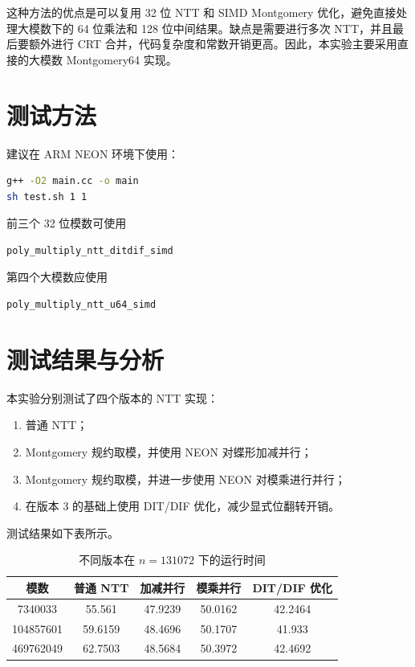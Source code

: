 \documentclass[a4paper]{article}
\begin{document}
这种方法的优点是可以复用 32 位 NTT 和 SIMD Montgomery 优化，避免直接处理大模数下的 64 位乘法和 128 位中间结果。缺点是需要进行多次 NTT，并且最后要额外进行 CRT 合并，代码复杂度和常数开销更高。因此，本实验主要采用直接的大模数 Montgomery64 实现。


\section{测试方法}

建议在 ARM NEON 环境下使用：
\begin{lstlisting}[language=bash]
g++ -O2 main.cc -o main
sh test.sh 1 1
\end{lstlisting}

前三个 32 位模数可使用
\begin{lstlisting}
poly_multiply_ntt_ditdif_simd
\end{lstlisting}
第四个大模数应使用
\begin{lstlisting}
poly_multiply_ntt_u64_simd
\end{lstlisting}

\section{测试结果与分析}

本实验分别测试了四个版本的 NTT 实现：

\begin{enumerate}
    \item 普通 NTT；
    \item Montgomery 规约取模，并使用 NEON 对蝶形加减并行；
    \item Montgomery 规约取模，并进一步使用 NEON 对模乘进行并行；
    \item 在版本 3 的基础上使用 DIT/DIF 优化，减少显式位翻转开销。
\end{enumerate}

测试结果如下表所示。

\begin{table}[h]
\centering
\begin{tabular}{ccccc}
\toprule
模数 & 普通 NTT & 加减并行 & 模乘并行 & DIT/DIF 优化 \\
\midrule
7340033 & 55.561 & 47.9239 & 50.0162 & 42.2464 \\
104857601 & 59.6159 & 48.4696 & 50.1707 & 41.933 \\
469762049 & 62.7503 & 48.5684 & 50.3972 & 42.4692 \\
\bottomrule
\end{tabular}
\caption{不同版本在 $n=131072$ 下的运行时间}
\end{table}
\end{document}
